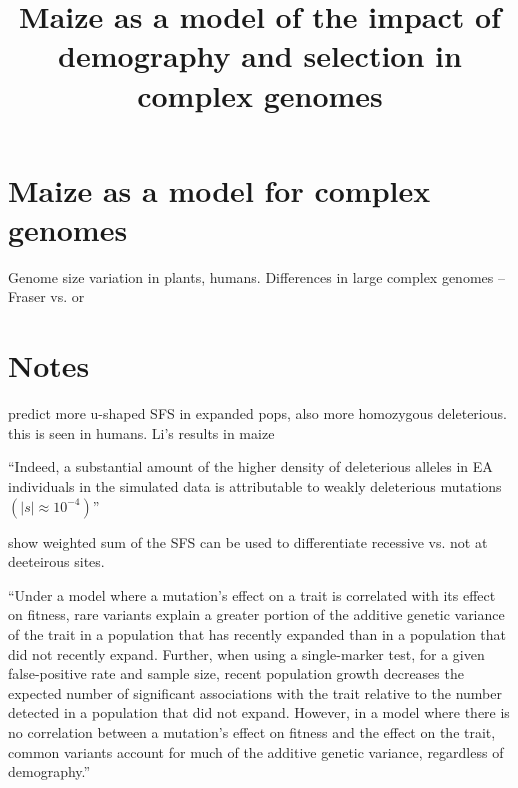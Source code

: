 \documentclass[12pt]{article}
\begin{document}
\title{\vspace{-5ex}Maize as a model of the impact of demography and selection in complex genomes\vspace{-4ex}}
\author{}
\date{}
\maketitle

\section*{Maize as a model for complex genomes}

Genome size variation in plants, humans. 
Differences in large complex genomes -- Fraser \citep{fraser2013gene} vs. \citep{pyhajarvi2013complex} or \citep{hancock2011adaptation}

\section*{Notes}

\citep{peischl2015expansion} predict more u-shaped SFS in expanded pops, also more homozygous deleterious. this is seen in humans. Li's results in maize

\citep{fu2014characteristics}
``Indeed, a substantial amount of the higher density of deleterious alleles in EA individuals in the simulated data is attributable to weakly deleterious mutations $(|s| \approx 10^{-4})$''

\citep{balick2013response} show weighted sum of the SFS can be used to differentiate recessive vs. not at deeteirous sites.

\citep{lohmueller2014impact} 
``Under a model where a mutation's effect on a trait is correlated with its effect on fitness, rare variants explain a greater portion of the additive genetic variance of the trait in a population that has recently expanded than in a population that did not recently expand. Further, when using a single-marker test, for a given false-positive rate and sample size, recent population growth decreases the expected number of significant associations with the trait relative to the number detected in a population that did not expand. However, in a model where there is no correlation between a mutation's effect on fitness and the effect on the trait, common variants account for much of the additive genetic variance, regardless of demography.''
%
%





\newpage

\end{document}
